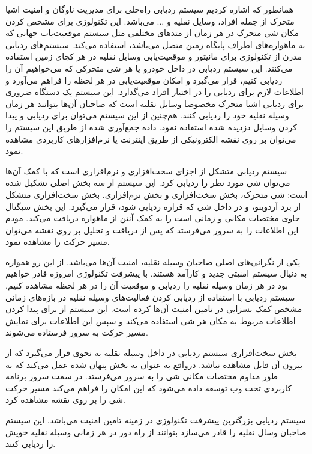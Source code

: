 همانطور که اشاره کردیم سیستم ردیابی راه‌حلی برای مدیریت ناوگان و امنیت اشیا متحرک از جمله افراد، وسایل نقلیه و ... می‌باشد. این تکنولوژی برای مشخص کردن مکان شی متحرک در هر زمان از متدهای مختلفی مثل سیستم موقعیت‌یاب جهانی  که به ماهواره‌های اطراف پایگاه زمین متصل می‌باشد، استفاده می‌کند. سیستم‌های ردیابی مدرن از تکنولوژی  برای مانیتور و موقعیت‌یابی وسایل نقلیه در هر کجای زمین استفاده می‌کنند. این سیستم ردیابی در داخل خودرو یا هر شی متحرکی که می‌خواهیم آن را ردیابی کنیم، قرار می‌گیرد و امکان موقعیت‌یابی در هر لحظه را فراهم می‌آورد  و اطلاعات لازم برای ردیابی را در اختیار افراد می‌گذارد. این سیستم یک دستگاه ضروری برای ردیابی اشیا متحرک مخصوصا وسایل نقلیه است که صاحبان آن‌ها بتوانند هر زمان وسیله نقلیه خود را ردیابی کنند. هم‌چنین از این سیستم می‌توان برای ردیابی و پیدا کردن وسایل دزدیده شده استفاده نمود. داده جمع‌آوری شده از طریق این سیستم را می‌توان بر روی نقشه الکترونیکی از طریق اینترنت یا نرم‌افزارهای کاربردی مشاهده نمود.


سیستم ردیابی متشکل از اجزای سخت‌افزاری و نرم‌افزاری است که با کمک آن‌ها می‌توان شی مورد نظر را ردیابی کرد. این سیستم از سه بخش اصلی تشکیل شده است: شی متحرک، بخش سخت‌افزاری و بخش نرم‌افزاری.
بخش سخت‌افزاری متشکل از برد آردوینو،  و  در داخل شی که قراره ردیابی شود، قرار می‌گیرد. این بخش سیگنال حاوی مختصات مکانی و زمانی است را به کمک آنتن  از ماهواره دریافت می‌کند. مودم  این اطلاعات را به سرور می‌فرستد که پس از دریافت و تحلیل بر روی نقشه می‌توان مسیر حرکت را مشاهده نمود.


 یکی از نگرانی‌های اصلی صاحبان وسیله نقلیه، امنیت آن‌ها می‌باشد. از این رو همواره به دنیال سیستم امنیتی جدید و کارآمد هستند. با پیشرفت تکنولوژی امروزه قادر خواهیم بود در هر زمان وسیله نقلیه را ردیابی و موقعیت آن را در هر لحظه مشاهده کنیم. سیستم ردیابی با استفاده از ردیابی  کردن فعالیت‌های وسیله نقلیه در بازه‌های زمانی مشخص کمک بسزایی در تامین امنیت آن‌ها کرده است. این سیستم از  برای پیدا کردن اطلاعات مربوط به مکان هر شی استفاده می‌کند و سپس  این اطلاعات برای نمایش مسیر حرکت به سرور فرستاده می‌شوند.
 
 
 بخش سخت‌افزاری سیستم ردیابی در داخل وسیله نقلیه به نحوی قرار می‌گیرد که از بیرون آن قابل مشاهده نباشد. درواقع به عنوان یه بخش پنهان شده عمل می‌کند که به طور مداوم مختصات مکانی شی را به سرور می‌فرستد.
 در سمت سرور برنامه کاربردی تحت وب توسعه داده می‌شود که این امکان را فراهم می‌کند  مسیر حرکت شی را بر روی نقشه مشاهده کرد.
 
 سیستم ردیابی بزرگترین پیشرفت تکنولوژی در زمینه تامین امنیت می‌باشد. این سیستم صاحبان وسال نقلیه را قادر می‌سازد بتوانند از راه دور در هر زمانی وسیله نقلیه خویش را ردیابی کنند.
 
